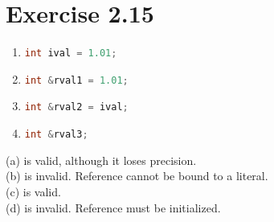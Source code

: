 \documentclass{article}
\begin{document}
\section*{Exercise 2.15}

\begin{enumerate}[label=(\alph*)]
\item \lstinline[language=C++]|int ival = 1.01;|
\item \lstinline[language=C++]|int &rval1 = 1.01;|
\item \lstinline[language=C++]|int &rval2 = ival;|
\item \lstinline[language=C++]|int &rval3;|
\end{enumerate}

\begin{flushleft}
(a) is valid, although it loses precision. \\
(b) is invalid. Reference cannot be bound to a literal. \\
(c) is valid. \\
(d) is invalid. Reference must be initialized.
\end{flushleft}
\end{document}
